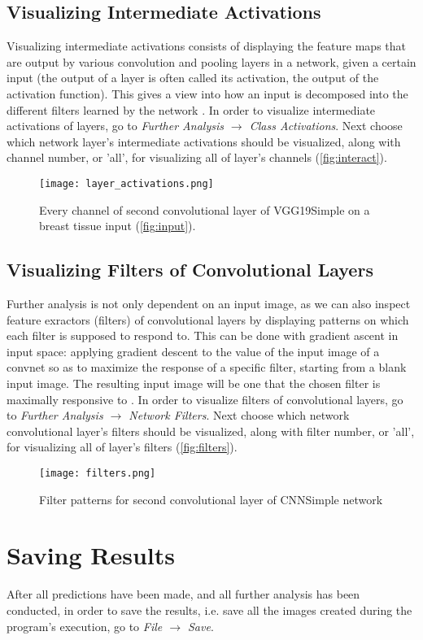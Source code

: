 \subsection{Visualizing Intermediate Activations}

Visualizing intermediate activations consists of displaying the feature maps that are output by various convolution and pooling layers in a network, given a certain input (the output of a layer is often called its activation, the output of the activation function). This gives a view into how an input is decomposed into the different filters learned by the network \cite{chollet2018deep}. In order to visualize intermediate activations of layers, go to \emph{Further Analysis $\rightarrow$ Class Activations}. Next choose which network layer's intermediate activations should be visualized, along with channel number, or 'all', for visualizing all of layer's channels  (\textcolor{red}{\autoref{fig:interact}}).

\begin{figure}[h]
	\centering
	\texttt{[image: layer\_activations.png]}
	\caption{Every channel of second convolutional layer of VGG19Simple on a breast tissue input (\textcolor{red}{\autoref{fig:input}}).}
	\label{fig:interact}
\end{figure}

\subsection{Visualizing Filters of Convolutional Layers}

Further analysis is not only dependent on an input image, as we can also inspect feature exractors (filters) of convolutional layers by displaying patterns on which each filter is supposed to respond to. This can be done with gradient ascent in input space: applying gradient descent to the value of the input image of a convnet so as to maximize the response of a specific filter, starting from a blank input image. The resulting input image will be one that the chosen filter is maximally responsive to \cite{chollet2018deep}. In order to visualize filters of convolutional layers, go to \emph{Further Analysis $\rightarrow$ Network Filters}.  Next choose which network convolutional layer's filters should be visualized, along with filter number, or 'all', for visualizing all of layer's filters  (\textcolor{red}{\autoref{fig:filters}}).

\begin{figure}[h]
	\centering
	\texttt{[image: filters.png]}
	\caption{Filter patterns for second convolutional layer of CNNSimple network}
	\label{fig:filters}
\end{figure}

\section{Saving Results}
After all predictions have been made, and all further analysis has been conducted, in order to save the results, i.e. save all the images created during the program's execution, go to \emph{File $\rightarrow$ Save}.
